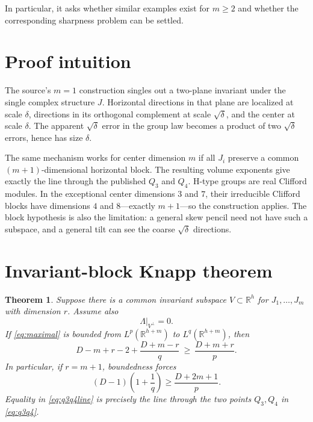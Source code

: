 \documentclass[11pt]{article}
\newtheorem{theorem}{Theorem}
\newcommand{\R}{\mathbb R}
\begin{document}
\noindent In particular, it asks whether similar examples exist for
$m\geq2$ and whether the corresponding sharpness problem can be settled.

\section{Proof intuition}

The source's $m=1$ construction singles out a two-plane invariant under the
single complex structure $J$.  Horizontal directions in that plane are
localized at scale $\delta$, directions in its orthogonal complement at scale
$\sqrt\delta$, and the center at scale $\delta$.  The apparent
$\sqrt\delta$ error in the group law becomes a product of two
$\sqrt\delta$ errors, hence has size $\delta$.

The same mechanism works for center dimension $m$ if all $J_i$ preserve a
common $(m+1)$-dimensional horizontal block.  The resulting volume exponents
give exactly the line through the published $Q_3$ and $Q_4$.  H-type groups
are real Clifford modules.  In the exceptional center dimensions $3$ and
$7$, their irreducible Clifford blocks have dimensions $4$ and $8$---exactly
$m+1$---so the construction applies.  The block hypothesis is also the
limitation: a general skew pencil need not have such a subspace, and a general
tilt can see the coarse $\sqrt\delta$ directions.

\section{Invariant-block Knapp theorem}

\begin{theorem}\label{thm:block}
Suppose there is a common invariant subspace $V\subset\R^h$ for
$J_1,\ldots,J_m$ with dimension $r$.  Assume also
\begin{equation}\label{eq:tiltcondition}
 \Lambda|_{V^\perp}=0.
\end{equation}
If \eqref{eq:maximal} is bounded from $L^p(\R^{h+m})$ to
$L^q(\R^{h+m})$, then
\begin{equation}\label{eq:generalnec}
 D-m+r-2+\frac{D+m-r}{q}\ \geq\
 \frac{D+m+r}{p}.
\end{equation}
In particular, if $r=m+1$, boundedness forces
\begin{equation}\label{eq:q3q4line}
 (D-1)\left(1+\frac1q\right)\geq
 \frac{D+2m+1}{p}.
\end{equation}
Equality in \eqref{eq:q3q4line} is precisely the line through the two points
$Q_3,Q_4$ in \eqref{eq:q3q4}.
\end{theorem}
\end{document}
